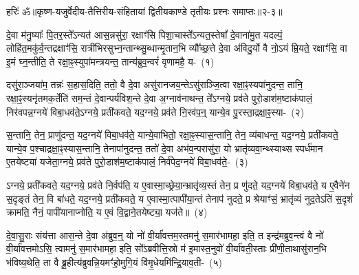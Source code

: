 {\anuvakamend[{यु॒वं वी॒तमा॒ विवा॑सति॒ पन्था॑नो दीर्घया॒थैः सोम॑स्य॒ ता मद॒ इन्द्र॑श्चकार दे॒वा नव॑ च}]}%

{हरिः॑ ॐ}{॥कृष्ण-यजुर्वेदीय-तैत्तिरीय-संहितायां द्वितीयकाण्डे तृतीयः प्रश्नः समाप्तः॥२-३॥}

\setcounter{anuvakam}{0}
दे॒वा म॑नु॒ष्याः᳚ पि॒तर॒स्ते᳚\-ऽन्यत॑ आस॒न्नसु॑रा॒ रक्षाꣳ॑सि पिशा॒चास्ते᳚\-ऽन्यत॒स्तेषां᳚ दे॒वाना॑मु॒त यदल्पं॒ लोहि॑त॒मकु॑र्व॒न्तद्रक्षाꣳ॑सि॒ रात्री॑भिरसुभ्न॒न्तान्थ्सु॒ब्धान्मृ॒तान॒भि व्यौ᳚च्छ॒त्ते दे॒वा अ॑विदु॒र्यो वै नो॒\-ऽयं म्रि॒यते॒ रक्षाꣳ॑सि॒ वा इ॒मं घ्न॒न्तीति॒ ते रक्षा॒ꣴ॒स्युपा॑मन्त्रयन्त॒ तान्य॑ब्रुव॒न्वरं॑ वृणामहै॒ य-~(१)\ip

दसु॑रा॒ञ्जया॑म॒ तन्नः॑ स॒हास॒दिति॒ ततो॒ वै दे॒वा असु॑रानजय॒न्ते\-ऽसु॑राञ्जि॒त्वा रक्षा॒ꣴ॒स्यपा॑नुदन्त॒ तानि॒ रक्षा॒ꣴ॒स्यनृ॑तमक॒र्तेति॑ सम॒न्तं दे॒वान्पर्य॑विश॒न्ते दे॒वा अ॒ग्नाव॑नाथन्त॒ ते᳚\-ऽग्नये॒ प्रव॑ते पुरो॒डाश॑\-म॒ष्टा\-क॑पालं॒ निर॑वपन्न॒ग्नये॑ विबा॒धव॑ते॒\-ऽग्नये॒ प्रती॑कवते॒ यद॒ग्नये॒ प्रव॑ते नि॒रव॑प॒न्॒ यान्ये॒व पु॒रस्ता॒द्रक्षा॒ꣴ॒स्या-~(२)\ip

स॒न्तानि॒ तेन॒ प्राणु॑दन्त॒ यद॒ग्नये॑ विबा॒धव॑ते॒ यान्ये॒वाभितो॒ रक्षा॒ꣴ॒स्यास॒न्तानि॒ तेन॒ व्य॑बाधन्त॒ यद॒ग्नये॒ प्रती॑कवते॒ यान्ये॒व प॒श्चाद्रक्षा॒ꣴ॒स्यास॒न्तानि॒ तेनापा॑नुदन्त॒ ततो॑ दे॒वा अभ॑व॒न्परासु॑रा॒ यो भ्रातृ॑व्यवा॒न्थ्स्याथ्स स्पर्ध॑मान ए॒तयेष्ट्या॑ यजेता॒ग्नये॒ प्रव॑ते पुरो॒डाश॑\-म॒ष्टा\-क॑पालं॒ निर्व॑पेद॒ग्नये॑ विबा॒धव॑ते॒-~(३)\ip

ऽग्नये॒ प्रती॑कवते॒ यद॒ग्नये॒ प्रव॑ते नि॒र्वप॑ति॒ य ए॒वास्मा॒\-च्छ्रेया॒न्भ्रातृ॑व्य॒स्तं तेन॒ प्र णु॑दते॒ यद॒ग्नये॑ विबा॒धव॑ते॒ य ए॒वैने॑न स॒दृङ्तं तेन॒ वि बा॑धते॒ यद॒ग्नये॒ प्रती॑कवते॒ य ए॒वास्मा॒त्पापी॑या॒न्तं तेनाप॑ नुदते॒ प्र श्रेयाꣳ॑सं॒ भ्रातृ॑व्यं नुद॒ते\-ऽति॑ स॒दृशं॑ क्रामति॒ नैनं॒ पापी॑यानाप्नोति॒ य ए॒वं वि॒द्वाने॒तयेष्ट्या॒ यज॑ते॥~(४)\ip

{\anuvakamend[{वृ॒णा॒म॒है॒ यत्पु॒रस्ता॒द्रक्षाꣳ॑सि वपेद॒ग्नये॑ विबा॒धव॑त ए॒वं च॒त्वारि॑ च}]}

दे॒वा॒सु॒राः संय॑त्ता आस॒न्ते दे॒वा अ॑ब्रुव॒न्॒ यो नो॑ वी॒र्या॑वत्तम॒स्तमनु॑ स॒मार॑भामहा॒ इति॒ त इन्द्र॑मब्रुव॒न्त्वं वै नो॑ वी॒र्या॑वत्तमो\-ऽसि॒ त्वामनु॑ स॒मार॑भामहा॒ इति॒ सो᳚\-ऽब्रवीत्ति॒स्रो म॑ इ॒मास्त॒नुवो॑ वी॒र्या॑वती॒स्ताः प्री॑णी॒ताथासु॑रान॒भि भ॑विष्य॒थेति॒ ता वै ब्रू॒हीत्य॑ब्रुवन्नि॒यमꣳ॑हो॒मुगि॒यं वि॑मृ॒धेयमि॑न्द्रि॒याव॒ती-~(५)\ip

